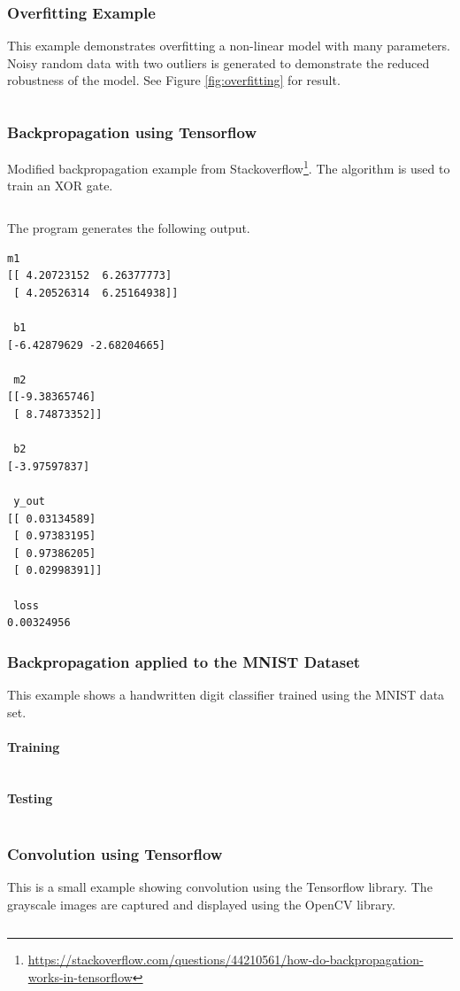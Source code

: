 \documentclass[a4paper,twoside,10pt]{article}
\begin{document}
\subsubsection{Overfitting Example}\label{app:overfitting}
This example demonstrates overfitting a non-linear model with many parameters.
Noisy random data with two outliers is generated to demonstrate the reduced robustness of the model.
See Figure \ref{fig:overfitting} for result.
\inputminted[frame=lines,linenos,fontsize=\small]{python}{overfitting.py}

\subsubsection{Backpropagation using Tensorflow}\label{app:backprop}
Modified backpropagation example from Stackoverflow\footnote{\url{https://stackoverflow.com/questions/44210561/how-do-backpropagation-works-in-tensorflow}}.
The algorithm is used to train an XOR gate.
\inputminted[frame=lines,linenos,fontsize=\small]{python}{backprop.py}
The program generates the following output.
\begin{verbatim}
m1
[[ 4.20723152  6.26377773]
 [ 4.20526314  6.25164938]]

 b1
[-6.42879629 -2.68204665]

 m2
[[-9.38365746]
 [ 8.74873352]]

 b2
[-3.97597837]

 y_out
[[ 0.03134589]
 [ 0.97383195]
 [ 0.97386205]
 [ 0.02998391]]

 loss
0.00324956
\end{verbatim}

\subsubsection{Backpropagation applied to the MNIST Dataset}\label{app:mnistbackprop}
This example shows a handwritten digit classifier trained using the MNIST data set.
\paragraph{Training}
\inputminted[frame=lines,linenos,fontsize=\small]{python}{mnist-backprop.py}
\paragraph{Testing}
\inputminted[frame=lines,linenos,fontsize=\small]{python}{mnist-run.py}

\subsubsection{Convolution using Tensorflow}\label{app:convolution}
This is a small example showing convolution using the Tensorflow library.
The grayscale images are captured and displayed using the OpenCV library.
\inputminted[frame=lines,linenos,fontsize=\small]{python}{convolution.py}
\end{document}

